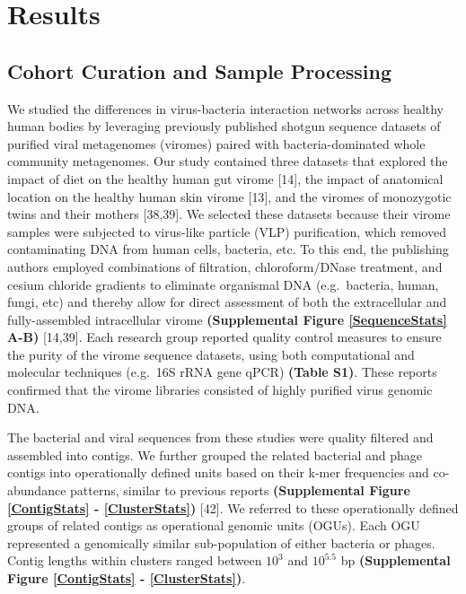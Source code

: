 \documentclass[12pt,]{article}
\begin{document}
\section{Results}\label{results}

\subsection{Cohort Curation and Sample
Processing}\label{cohort-curation-and-sample-processing}

We studied the differences in virus-bacteria interaction networks across
healthy human bodies by leveraging previously published shotgun sequence
datasets of purified viral metagenomes (viromes) paired with
bacteria-dominated whole community metagenomes. Our study contained
three datasets that explored the impact of diet on the healthy human gut
virome {[}14{]}, the impact of anatomical location on the healthy human
skin virome {[}13{]}, and the viromes of monozygotic twins and their
mothers {[}38,39{]}. We selected these datasets because their virome
samples were subjected to virus-like particle (VLP) purification, which
removed contaminating DNA from human cells, bacteria, etc. To this end,
the publishing authors employed combinations of filtration,
chloroform/DNase treatment, and cesium chloride gradients to eliminate
organismal DNA (e.g.~bacteria, human, fungi, etc) and thereby allow for
direct assessment of both the extracellular and fully-assembled
intracellular virome \textbf{(Supplemental Figure \ref{SequenceStats}
A-B)} {[}14,39{]}. Each research group reported quality control measures
to ensure the purity of the virome sequence datasets, using both
computational and molecular techniques (e.g.~16S rRNA gene qPCR)
\textbf{(Table S1)}. These reports confirmed that the virome libraries
consisted of highly purified virus genomic DNA.

The bacterial and viral sequences from these studies were quality
filtered and assembled into contigs. We further grouped the related
bacterial and phage contigs into operationally defined units based on
their k-mer frequencies and co-abundance patterns, similar to previous
reports \textbf{(Supplemental Figure \ref{ContigStats} -
\ref{ClusterStats})} {[}42{]}. We referred to these operationally
defined groups of related contigs as operational genomic units (OGUs).
Each OGU represented a genomically similar sub-population of either
bacteria or phages. Contig lengths within clusters ranged between
\(10^{3}\) and \(10^{5.5}\) bp \textbf{(Supplemental Figure
\ref{ContigStats} - \ref{ClusterStats})}.
\end{document}
